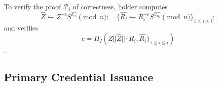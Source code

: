 \documentclass[a4paper]{article}
\begin{document}
To verify the proof $\mathcal{P}_i$ of correctness, holder
computes
$$
\widehat{Z} \leftarrow Z^{-c} S^{\widehat{x_Z}}\pmod{n} ;\quad  \{\widehat{R_i}
\leftarrow R_i^{-c} S^{\widehat{x_{R_i}}}\pmod{n}\}_{1\leq i \leq l};
$$
and verifies
$$
c =  H_I(Z||\widehat{Z}||\{R_i,\widehat{R_i}\}_{1\leq i \leq l})
$$.


\subsection{Primary Credential Issuance}
\begin{comment}
\begin{enumerate}
    \item Retrieve the current  value $\mathrm{acc}$ for accumulator $A_{R_i}$ and the  set $V$ of issued and non-revoked credential numbers.
    \item $H()$ is a hash function where the output length is 256 bits.
    \item $||$ denotes concatenation.
    \item $U_i$ is the identificator of the user $i$.
    \item Compute $$
\overline{S} = A_{R_i}||U_i,\quad H_{\overline{S}} = H(\overline{S})
$$
and sets $m_2 = H_{\overline{S}}$.
    \item Create 256-bit integer attributes $\{m_i\}_{i \in A_k}$ for the holder.
    \item Generate 80-bit nonce $n_0$ and send to the holder.
\end{enumerate}
Holder:

\end{comment}
\end{document}
